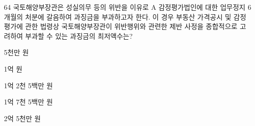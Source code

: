 \begin{question}{64}
국토해양부장관은 성실의무 등의 위반을 이유로 A 감정평가법인에 대한 업무정지 6개월의 처분에 갈음하여 과징금을 부과하고자 한다. 이 경우 부동산 가격공시 및 감정평가에 관한 법령상 국토해양부장관이 위반행위와 관련한 제반 사정을 종합적으로 고려하여 부과할 수 있는 과징금의 최저액수는?
\begin{choices}
  \item 5천만 원
  \item 1억 원
  \item 1억 2천 5백만 원
  \item 1억 7천 5백만 원
  \item 2억 5천만 원
\end{choices}
\end{question}
